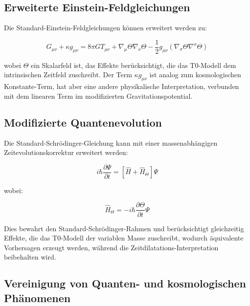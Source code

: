 \documentclass[twocolumn,aps,prl]{revtex4-2}
\begin{document}
	\subsection{Erweiterte Einstein-Feldgleichungen}
	\label{subsec:extended_einstein}
	
	Die Standard-Einstein-Feldgleichungen können erweitert werden zu:
	
	\begin{equation}
		G_{\mu\nu} + \kappa g_{\mu\nu} = 8\pi G T_{\mu\nu} + \nabla_{\mu}\Theta\nabla_{\nu}\Theta - \frac{1}{2}g_{\mu\nu}(\nabla_{\sigma}\Theta\nabla^{\sigma}\Theta)
		\label{eq:extended_einstein}
	\end{equation}
	
	wobei \(\Theta\) ein Skalarfeld ist, das Effekte berücksichtigt, die das T0-Modell dem intrinsischen Zeitfeld zuschreibt. Der Term \(\kappa g_{\mu\nu}\) ist analog zum kosmologischen Konstante-Term, hat aber eine andere physikalische Interpretation, verbunden mit dem linearen Term im modifizierten Gravitationspotential.
	
	\subsection{Modifizierte Quantenevolution}
	\label{subsec:quantum_evolution}
	
	Die Standard-Schrödinger-Gleichung kann mit einer massenabhängigen Zeitevolutionskorrektur erweitert werden:
	
	\begin{equation}
		i\hbar\frac{\partial\Psi}{\partial t} = [\hat{H} + \hat{H}_{\Theta}]\Psi
		\label{eq:extended_schrodinger}
	\end{equation}
	
	wobei:
	
	\begin{equation}
		\hat{H}_{\Theta} = -i\hbar\frac{\partial\Theta}{\partial t}\Psi
		\label{eq:h_theta}
	\end{equation}
	
	Dies bewahrt den Standard-Schrödinger-Rahmen und berücksichtigt gleichzeitig Effekte, die das T0-Modell der variablen Masse zuschreibt, wodurch äquivalente Vorhersagen erzeugt werden, während die Zeitdilatations-Interpretation beibehalten wird.
	
	\subsection{Vereinigung von Quanten- und kosmologischen Phänomenen}
	\label{subsec:quantum_cosmological_unification}
	
\end{document}

